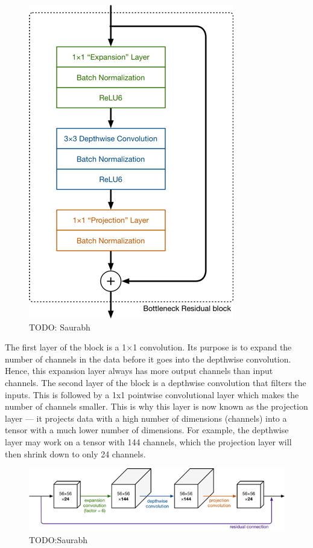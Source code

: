 \documentclass[12pt,letterpaper]{article}
\begin{document}
\begin{figure}[H]
\centering
\includegraphics[scale = 0.5]{assets/ssdstruct1.png}
\caption{TODO: Saurabh}
\end{figure}

The first layer of the block is a 1×1 convolution. Its purpose is to expand the number of channels in the data before it goes into the depthwise convolution. Hence, this expansion layer always has more output channels than input channels. The second layer of the block is a depthwise convolution that filters the inputs. This is followed by a 1x1 pointwise convolutional layer which makes the number of channels smaller. This is why this layer is now known as the projection layer — it projects data with a high number of dimensions (channels) into a tensor with a much lower number of dimensions. For example, the depthwise layer may work on a tensor with 144 channels, which the projection layer will then shrink down to only 24 channels.

\begin{figure}[h!]
\includegraphics[width=\textwidth,keepaspectratio]{assets/ssdstruct2.png}
\caption{TODO:Saurabh}
\end{figure}
\end{document}
